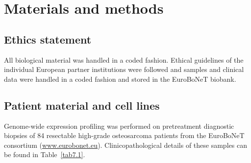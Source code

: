 \section{Materials and methods}\label{methods7}
\subsection{Ethics statement}
All biological material was handled in a coded
fashion. Ethical guidelines of the individual European
partner institutions were followed and samples
and clinical data were handled in a coded
fashion and stored in the EuroBoNeT biobank.

\subsection{Patient material and cell lines}
Genome\hyp{}wide expression profiling was performed
on pretreatment diagnostic biopsies of 84
resectable high\hyp{}grade osteosarcoma patients from
the EuroBoNeT consortium (\url{www.eurobonet.eu}).
Clinicopathological details of these samples can
be found in Table~\ref{tab7.1}.
%
